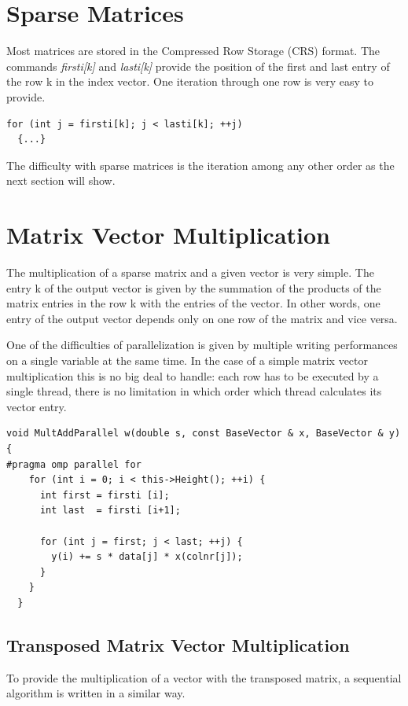 \documentclass[a4paper,11pt]{scrartcl}
\begin{document}
\section{Sparse Matrices}
Most matrices are stored in the Compressed Row Storage (CRS) format.
The commands {\em firsti[k]}\/ and {\em lasti[k]}\/ provide the position of the
first and last entry of the row k in the index vector. One
iteration through one row is very easy to provide.

\begin{lstlisting}
for (int j = firsti[k]; j < lasti[k]; ++j)
  {...}
\end{lstlisting}

The difficulty with sparse matrices is the iteration among any other order as
the next section will show.

\section{Matrix Vector Multiplication}
The multiplication of a sparse matrix and a given vector is very simple.
The entry k of the output vector is given by the summation of the products
of the matrix entries in the row k with the entries of the vector. In other
words, one entry of the output vector depends only on one row of the matrix
and vice versa.

One of the difficulties of parallelization is given by multiple writing
performances on a single variable at the same time. In the case of a simple
matrix vector multiplication this is no big deal to handle: each row has to be
executed by a single thread, there is no limitation in which order which thread
calculates its vector entry.

\begin{lstlisting}
void MultAddParallel w(double s, const BaseVector & x, BaseVector & y)
{
#pragma omp parallel for
    for (int i = 0; i < this->Height(); ++i) {
      int first = firsti [i];
      int last  = firsti [i+1];

      for (int j = first; j < last; ++j) {
        y(i) += s * data[j] * x(colnr[j]);
      }
    }
  }

\end{lstlisting}

\subsection{Transposed Matrix Vector Multiplication}\label{section:trans}
To provide the multiplication of a vector with the transposed matrix, a
sequential algorithm is written in a similar way.
\end{document}
